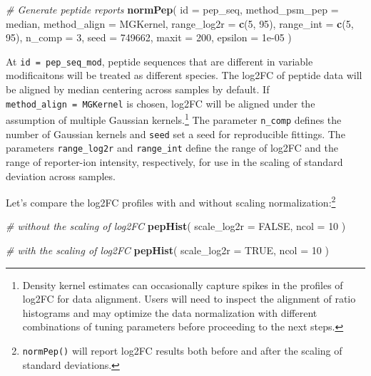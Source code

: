 \documentclass[]{article}
\newenvironment{Shaded}{\begin{snugshade}}{\end{snugshade}}
\newcommand{\CommentTok}[1]{\textcolor[rgb]{0.56,0.35,0.01}{\textit{#1}}}
\newcommand{\DataTypeTok}[1]{\textcolor[rgb]{0.13,0.29,0.53}{#1}}
\newcommand{\DecValTok}[1]{\textcolor[rgb]{0.00,0.00,0.81}{#1}}
\newcommand{\FloatTok}[1]{\textcolor[rgb]{0.00,0.00,0.81}{#1}}
\newcommand{\KeywordTok}[1]{\textcolor[rgb]{0.13,0.29,0.53}{\textbf{#1}}}
\newcommand{\NormalTok}[1]{#1}
\newcommand{\OtherTok}[1]{\textcolor[rgb]{0.56,0.35,0.01}{#1}}
\let\rmarkdownfootnote\footnote%
\def\footnote{\protect\rmarkdownfootnote}
\begin{document}
\begin{Shaded}
\begin{Highlighting}[]
\CommentTok{# Generate peptide reports}
\KeywordTok{normPep}\NormalTok{(}
    \DataTypeTok{id =}\NormalTok{ pep_seq, }
    \DataTypeTok{method_psm_pep =}\NormalTok{ median, }
    \DataTypeTok{method_align =}\NormalTok{ MGKernel, }
    \DataTypeTok{range_log2r =} \KeywordTok{c}\NormalTok{(}\DecValTok{5}\NormalTok{, }\DecValTok{95}\NormalTok{), }
    \DataTypeTok{range_int =} \KeywordTok{c}\NormalTok{(}\DecValTok{5}\NormalTok{, }\DecValTok{95}\NormalTok{), }
    \DataTypeTok{n_comp =} \DecValTok{3}\NormalTok{, }
    \DataTypeTok{seed =} \DecValTok{749662}\NormalTok{, }
    \DataTypeTok{maxit =} \DecValTok{200}\NormalTok{, }
    \DataTypeTok{epsilon =} \FloatTok{1e-05}
\NormalTok{)}
\end{Highlighting}
\end{Shaded}

At \texttt{id\ =\ pep\_seq\_mod}, peptide sequences that are different
in variable modificaitons will be treated as different species. The
log2FC of peptide data will be aligned by median centering across
samples by default. If \texttt{method\_align\ =\ MGKernel} is chosen,
log2FC will be aligned under the assumption of multiple Gaussian
kernels.\footnote{Density kernel estimates can occasionally capture
  spikes in the profiles of log2FC for data alignment. Users will need
  to inspect the alignment of ratio histograms and may optimize the data
  normalization with different combinations of tuning parameters before
  proceeding to the next steps.} The parameter \texttt{n\_comp} defines
the number of Gaussian kernels and \texttt{seed} set a seed for
reproducible fittings. The parameters \texttt{range\_log2r} and
\texttt{range\_int} define the range of log2FC and the range of
reporter-ion intensity, respectively, for use in the scaling of standard
deviation across samples.

Let's compare the log2FC profiles with and without scaling
normalization:\footnote{\texttt{normPep()} will report log2FC results
  both before and after the scaling of standard deviations.}

\begin{Shaded}
\begin{Highlighting}[]
\CommentTok{# without the scaling of log2FC }
\KeywordTok{pepHist}\NormalTok{(}
 \DataTypeTok{scale_log2r =} \OtherTok{FALSE}\NormalTok{, }
 \DataTypeTok{ncol =} \DecValTok{10}
\NormalTok{)}

\CommentTok{# with the scaling of log2FC }
\KeywordTok{pepHist}\NormalTok{(}
 \DataTypeTok{scale_log2r =} \OtherTok{TRUE}\NormalTok{, }
 \DataTypeTok{ncol =} \DecValTok{10}
\NormalTok{)}
\end{Highlighting}
\end{Shaded}
\end{document}
